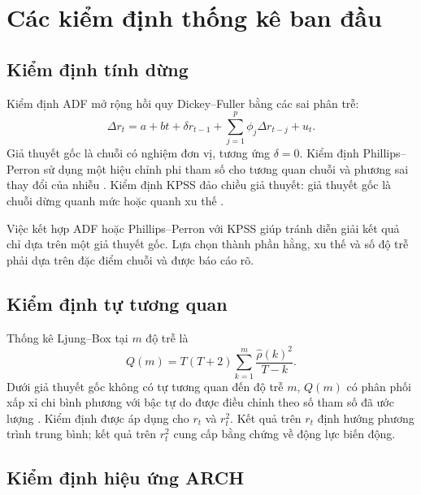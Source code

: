 \documentclass[12pt,a4paper]{article}
\numberwithin{equation}{section}
\begin{document}
\section{Các kiểm định thống kê ban đầu}\label{sec:kiem-dinh}

\subsection{Kiểm định tính dừng}\label{subsec:unit-root-tests}

Kiểm định ADF mở rộng hồi quy Dickey--Fuller bằng các sai phân trễ:
\begin{equation}
  \Delta r_t
  =
  a+bt+\delta r_{t-1}
  +\sum_{j=1}^{p}\phi_j\Delta r_{t-j}+u_t.
  \label{eq:adf}
\end{equation}
Giả thuyết gốc là chuỗi có nghiệm đơn vị, tương ứng $\delta=0$. Kiểm định Phillips--Perron sử dụng một hiệu chỉnh phi tham số cho tương quan chuỗi và phương sai thay đổi của nhiễu \cite{phillips1988}. Kiểm định KPSS đảo chiều giả thuyết: giả thuyết gốc là chuỗi dừng quanh mức hoặc quanh xu thế \cite{dickey1979,kpss1992}.

Việc kết hợp ADF hoặc Phillips--Perron với KPSS giúp tránh diễn giải kết quả chỉ dựa trên một giả thuyết gốc. Lựa chọn thành phần hằng, xu thế và số độ trễ phải dựa trên đặc điểm chuỗi và được báo cáo rõ.

\subsection{Kiểm định tự tương quan}\label{subsec:ljung-box}

Thống kê Ljung--Box tại $m$ độ trễ là
\begin{equation}
  Q(m)
  =
  T(T+2)
  \sum_{k=1}^{m}
  \frac{\widehat\rho(k)^2}{T-k}.
  \label{eq:ljung-box}
\end{equation}
Dưới giả thuyết gốc không có tự tương quan đến độ trễ $m$, $Q(m)$ có phân phối xấp xỉ chi bình phương với bậc tự do được điều chỉnh theo số tham số đã ước lượng \cite{ljung1978}. Kiểm định được áp dụng cho $r_t$ và $r_t^2$. Kết quả trên $r_t$ định hướng phương trình trung bình; kết quả trên $r_t^2$ cung cấp bằng chứng về động lực biến động.

\subsection{Kiểm định hiệu ứng ARCH}\label{subsec:arch-lm}
\end{document}
